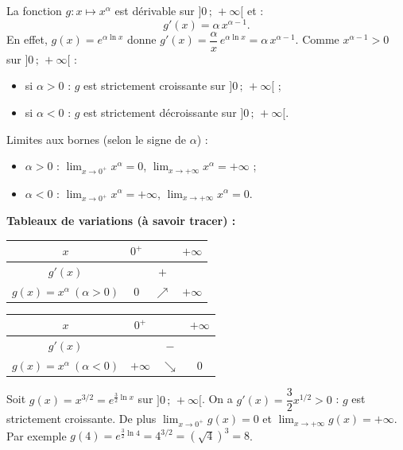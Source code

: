 \documentclass[11pt]{article}
\begin{document}
\begin{propriete}
La fonction $g : x \mapsto x^{\alpha}$ est dérivable sur $]0\,;\,+\infty[$ et :
\[ g'(x) = \alpha\, x^{\alpha - 1}. \]
En effet, $g(x) = e^{\alpha \ln x}$ donne $g'(x) = \dfrac{\alpha}{x}\, e^{\alpha \ln x} = \alpha\, x^{\alpha - 1}$. Comme $x^{\alpha-1} > 0$ sur $]0\,;\,+\infty[$ :
\begin{itemize}
\item si $\alpha > 0$ : $g$ est strictement croissante sur $]0\,;\,+\infty[$ ;
\item si $\alpha < 0$ : $g$ est strictement décroissante sur $]0\,;\,+\infty[$.
\end{itemize}
Limites aux bornes (selon le signe de $\alpha$) :
\begin{itemize}
\item $\alpha > 0$ : $\lim_{x \to 0^+} x^{\alpha} = 0$, $\lim_{x \to +\infty} x^{\alpha} = +\infty$ ;
\item $\alpha < 0$ : $\lim_{x \to 0^+} x^{\alpha} = +\infty$, $\lim_{x \to +\infty} x^{\alpha} = 0$.
\end{itemize}
\textbf{Tableaux de variations (à savoir tracer) :}
\begin{center}
\begin{tabular}{|c|ccc|}\hline
$x$ & $0^+$ & & $+\infty$ \\ \hline
$g'(x)$ & & $+$ & \\ \hline
$g(x)=x^{\alpha}\ (\alpha>0)$ & $0$ & $\nearrow$ & $+\infty$ \\ \hline
\end{tabular}
\qquad
\begin{tabular}{|c|ccc|}\hline
$x$ & $0^+$ & & $+\infty$ \\ \hline
$g'(x)$ & & $-$ & \\ \hline
$g(x)=x^{\alpha}\ (\alpha<0)$ & $+\infty$ & $\searrow$ & $0$ \\ \hline
\end{tabular}
\end{center}
\end{propriete}

\begin{exemplebox}
Soit $g(x) = x^{3/2} = e^{\frac{3}{2}\ln x}$ sur $]0\,;\,+\infty[$. On a $g'(x) = \dfrac{3}{2} x^{1/2} > 0$ : $g$ est strictement croissante. De plus $\lim_{x \to 0^+} g(x) = 0$ et $\lim_{x \to +\infty} g(x) = +\infty$. Par exemple $g(4) = e^{\frac{3}{2}\ln 4} = 4^{3/2} = \left(\sqrt{4}\right)^3 = 8$.
\end{exemplebox}
\end{document}
